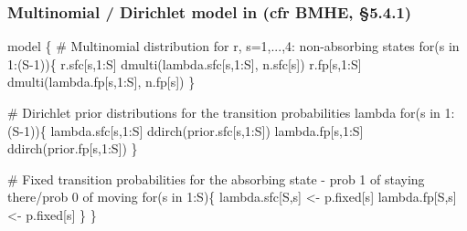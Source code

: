 

\begin{frame}[fragile]

\frametitle{Multinomial / Dirichlet model in \bugs \hspace{0pt plus 1filll}\small \textbf{(cfr BMHE, \S5.4.1)}}

{\footnotesize \olive
\begin{semiverbatim}
model \{
\blue# Multinomial distribution for r, s=1,...,4: non-absorbing states\olive
   for(s in 1:(S-1))\{
      r.sfc[s,1:S] \mytilde dmulti(lambda.sfc[s,1:S], n.sfc[s]) 
      r.fp[s,1:S] \mytilde dmulti(lambda.fp[s,1:S], n.fp[s])    
   \}

\blue# Dirichlet prior distributions for the transition probabilities lambda\olive
   for(s in 1:(S-1))\{
      lambda.sfc[s,1:S] \mytilde ddirch(prior.sfc[s,1:S])
      lambda.fp[s,1:S] \mytilde ddirch(prior.fp[s,1:S])
   \}

\blue# Fixed transition probabilities for the absorbing state - prob 1 of staying there/prob 0 of moving\olive 
   for(s in 1:S)\{
      lambda.sfc[S,s] <- p.fixed[s]
      lambda.fp[S,s] <- p.fixed[s]
   \}
\} 
\end{semiverbatim}
}
\end{frame}



